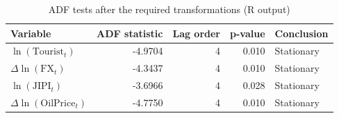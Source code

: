 \begin{table}[H]
\centering
\caption{ADF tests after the required transformations (R output)}
\label{tab:adf-transformed}
\begin{tabular}{lrrrl}
\toprule
Variable & ADF statistic & Lag order & p-value & Conclusion \\
\midrule
$\ln(\mathrm{Tourist}_t)$ & -4.9704 & 4 & 0.010 & Stationary \\
$\Delta \ln(\mathrm{FX}_t)$ & -4.3437 & 4 & 0.010 & Stationary \\
$\ln(\mathrm{JIPI}_t)$ & -3.6966 & 4 & 0.028 & Stationary \\
$\Delta \ln(\mathrm{OilPrice}_t)$ & -4.7750 & 4 & 0.010 & Stationary \\
\bottomrule
\end{tabular}
\end{table}
